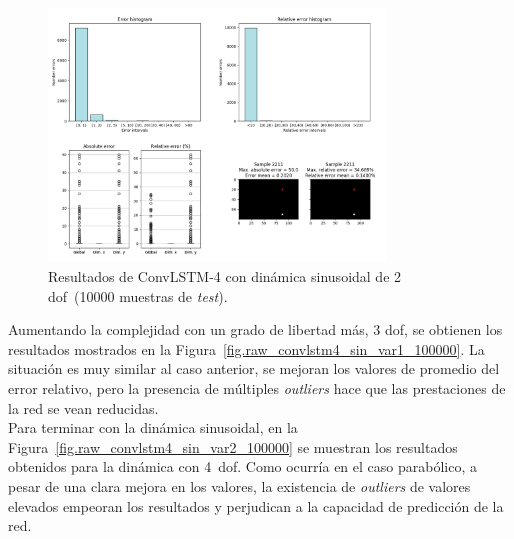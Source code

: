 \begin{figure}[H]
		\begin{center}
			\includegraphics[width=0.8\textwidth]{ figures/test_raw/REC/ConvLSTM_complex/sin_var_100000.png}
			\caption{Resultados de ConvLSTM-4 con dinámica sinusoidal de 2 \acrshort{dof}~(10000 muestras de \textit{test}).}
			\label{fig.raw_convlstm4_sin_var_100000}
		\end{center}
\end{figure}
\vspace{-10pt}

Aumentando la complejidad con un grado de libertad más, 3 \acrshort{dof}, se obtienen los resultados mostrados en la Figura~\ref{fig.raw_convlstm4_sin_var1_100000}. La situación es muy similar al caso anterior, se mejoran los valores de promedio del error relativo, pero la presencia de múltiples \textit{outliers} hace que las prestaciones de la red se vean reducidas.\\

Para terminar con la dinámica sinusoidal, en la Figura~\ref{fig.raw_convlstm4_sin_var2_100000} se muestran los resultados obtenidos para la dinámica con 4~\acrshort{dof}. Como ocurría en el caso parabólico, a pesar de una clara mejora en los valores, la existencia de \textit{outliers} de valores elevados empeoran los resultados y perjudican a la capacidad de predicción de la red.

